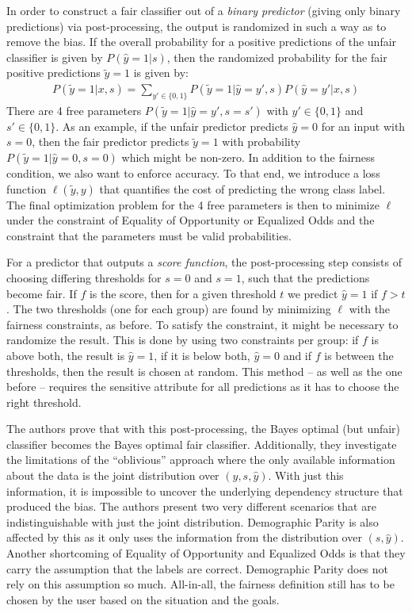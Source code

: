 In order to construct a fair classifier out of a \emph{binary predictor}
(giving only binary predictions) via post-processing,
the output is randomized in such a way as to remove the bias.
If the overall probability for a positive predictions of the unfair classifier is given by \(P(\hat{y}=1|s)\),
then the randomized probability for the fair positive predictions \(\tilde{y} = 1\) is given by:
\begin{align}
  \label{eq:hardt}
  P(\tilde{y}=1| x, s) = \sum\limits_{y' \in \{0, 1\}} P(\tilde{y} = 1| \hat{y}=y', s) 
  P(\hat{y}=y'| x, s)
\end{align}
There are 4 free parameters \(P(\tilde{y} = 1| \hat{y}=y', s=s')\) with \(y' \in \{0, 1\}\) and \(s' \in \{0, 1\}\).
As an example, if the unfair predictor predicts \(\hat{y} =0\) for an input with \(s=0\),
then the fair predictor predicts \(\tilde{y} =1\) with probability \(P(\tilde{y} = 1| \hat{y}=0, s=0)\)
which might be non-zero.
In addition to the fairness condition, we also want to enforce accuracy.
To that end, we introduce a loss function \(\ell (\tilde{y}, y)\)
that quantifies the cost of predicting the wrong class label.
The final optimization problem for the 4 free parameters is then to minimize \(\ell\)
under the constraint of Equality of Opportunity or Equalized Odds
and the constraint that the parameters must be valid probabilities.

For a predictor that outputs a \emph{score function},
the post-processing step consists of choosing differing thresholds for \(s=0\) and \(s=1\),
such that the predictions become fair.
If \(f\) is the score, then for a given threshold \(t\) we predict \(\hat{y} = 1\) if \(f > t\).
The two thresholds (one for each group) are found by minimizing \(\ell\) with the fairness constraints, as before.
To satisfy the constraint, it might be necessary to randomize the result.
This is done by using two constraints per group:
if \(f\) is above both, the result is \(\hat{y} = 1\), if it is below both, \(\hat{y} =0\)
and if \(f\) is between the thresholds, then the result is chosen at random.
This method -- as well as the one before --
requires the sensitive attribute for all predictions as it has to choose the right threshold.

The authors prove that with this post-processing,
the Bayes optimal (but unfair) classifier becomes the Bayes optimal fair classifier.
Additionally, they investigate the limitations of the ``oblivious'' approach
where the only available information about the data is the joint distribution over \((y, s, \hat{y})\).
With just this information, it is impossible to uncover the underlying dependency structure that produced the bias.
The authors present two very different scenarios that are indistinguishable with just the joint distribution.
Demographic Parity is also affected by this as it only uses the information from the distribution over \((s, \hat{y})\).
Another shortcoming of Equality of Opportunity and Equalized Odds is
that they carry the assumption that the labels are correct.
Demographic Parity does not rely on this assumption so much.
All-in-all, the fairness definition still has to be chosen by the user based on the situation and the goals.

